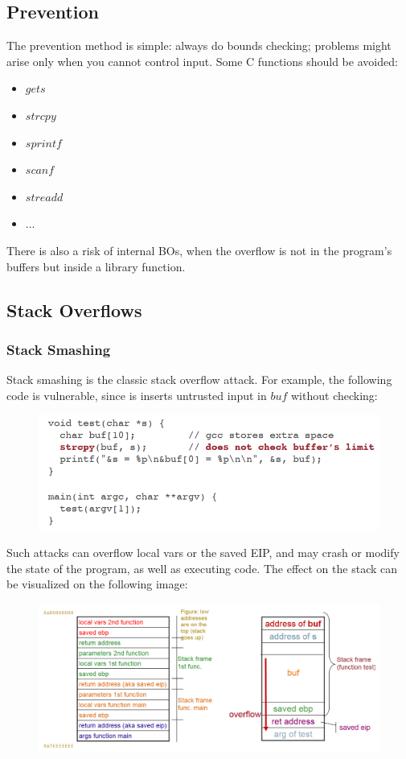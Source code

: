\documentclass[10pt,a4paper]{report}
\begin{document}
\subsection{Prevention}
The prevention method is simple: always do bounds checking; problems might arise only when you cannot control input. Some C functions should be avoided:
\begin{itemize}
\item $gets$
\item $strcpy$
\item $sprintf$
\item $scanf$
\item $streadd$
\item ...
\end{itemize}
There is also a risk of internal BOs, when the overflow is not in the program’s buffers but inside a library function.
\subsection{Stack Overflows}
\subsubsection{Stack Smashing}
Stack smashing is the classic stack overflow attack. For example, the following code is vulnerable, since is inserts untrusted input in $buf$ without checking:
\begin{figure}[H]
\centering
\includegraphics[scale=0.4]{13.png}
\end{figure}
Such attacks can overflow local vars or the saved EIP, and may crash or modify the state of the program, as well as executing code. The effect on the stack can be visualized on the following image:
\begin{figure}[H]
\centering
\includegraphics[scale=0.4]{14.png}
\end{figure}
\end{document}

